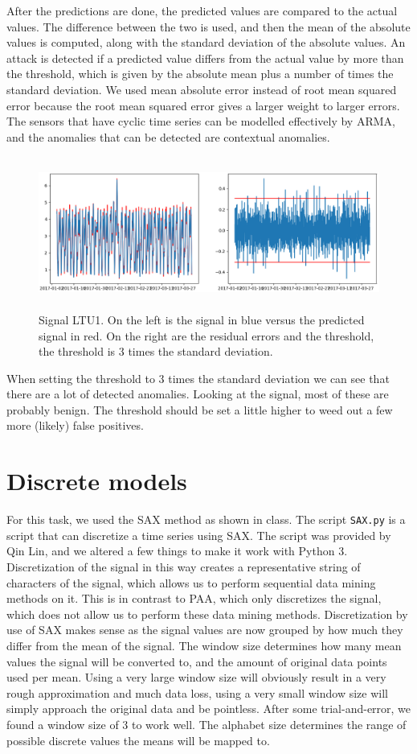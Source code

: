 \documentclass[]{article}
\begin{document}
After the predictions are done, the predicted values are compared to the actual values. The difference between the two is used, and then the mean of the absolute values is computed, along with the standard deviation of the absolute values. An attack is detected if a predicted value differs from the actual value by more than the threshold, which is given by the absolute mean plus a number of times the standard deviation. We used mean absolute error instead of root mean squared error because the root mean squared error gives a larger weight to larger errors. The sensors that have cyclic time series can be modelled effectively by ARMA, and the anomalies that can be detected are contextual anomalies.
\begin{center}
\begin{figure}[H]
  \includegraphics[width=16cm, height=5cm]{./visuallizations/arma_3stddev_LTU1.png}
  \caption{Signal LTU1. On the left is the signal in blue versus the predicted signal in red. On the right are the residual errors and the threshold, the threshold is 3 times the standard deviation.}
  \label{signals}
\end{figure}
\end{center}
When setting the threshold to 3 times the standard deviation we can see that there are a lot of detected anomalies. Looking at the signal, most of these are probably benign. The threshold should be set a little higher to weed out a few more (likely) false positives.
\section{Discrete models}
For this task, we used the SAX method as shown in class. The script \texttt{SAX.py} is a script that can discretize a time series using SAX. The script was provided by Qin Lin, and we altered a few things to make it work with Python 3. Discretization of the signal in this way creates a representative string of characters of the signal, which allows us to perform sequential data mining methods on it. This is in contrast to PAA, which only discretizes the signal, which does not allow us to perform these data mining methods. Discretization by use of SAX makes sense as the signal values are now grouped by how much they differ from the mean of the signal. The window size determines how many mean values the signal will be converted to, and the amount of original data points used per mean. Using a very large window size will obviously result in a very rough approximation and much data loss, using a very small window size will simply approach the original data and be pointless. After some trial-and-error, we found a window size of 3 to work well. The alphabet size determines the range of possible discrete values the means will be mapped to. 
\end{document}
